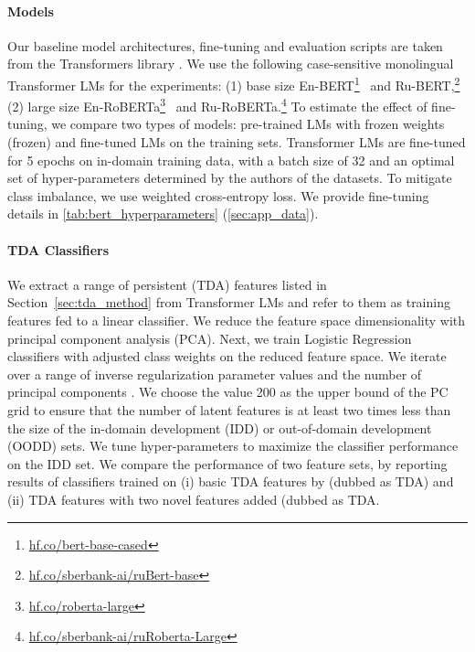 \documentclass[11pt]{article}
\begin{document}
\paragraph{Models}
Our baseline model architectures, fine-tuning and evaluation scripts are taken from the Transformers library \cite{wolf-etal-2020-transformers}. 
We use the following case-sensitive monolingual Transformer LMs for the experiments: 
(1) base size En-BERT\footnote{\href{https://huggingface.co/bert-base-cased}{hf.co/bert-base-cased}}~\cite{devlin-etal-2019-bert} and Ru-BERT,\footnote{\href{https://huggingface.co/sberbank-ai/ruBert-base}{hf.co/sberbank-ai/ruBert-base}} (2) large size En-RoBERTa\footnote{\href{https://huggingface.co/roberta-large}{hf.co/roberta-large}}~\cite{liu2019roberta} and Ru-RoBERTa.\footnote{\href{https://huggingface.co/sberbank-ai/ruRoberta-large}{hf.co/sberbank-ai/ruRoberta-Large}}
To estimate the effect of fine-tuning, we compare two types of models: pre-trained LMs with frozen weights (frozen) and fine-tuned LMs on the training sets.
Transformer LMs are fine-tuned for 5 epochs on in-domain training data, with a batch size of 32 and an optimal set of hyper-parameters determined by the authors of the datasets.
To mitigate class imbalance, we use weighted cross-entropy loss.
We provide fine-tuning details in \autoref{tab:bert_hyperparameters} (\autoref{sec:app_data}). 
\paragraph{TDA Classifiers}
We extract a range of persistent (TDA) features listed in Section~\ref{sec:tda_method} from Transformer LMs and refer to them as training features fed to a linear classifier.  
We reduce the feature space dimensionality with principal component analysis (PCA).
Next, we train Logistic Regression classifiers with adjusted class weights on the reduced feature space.
We iterate over a range of inverse regularization parameter values  and the number of principal components . 
We choose the value 200 as the upper bound of the PC grid to ensure that the number of latent features is at least two times less than the size of the  in-domain development (IDD) or out-of-domain development (OODD) sets. 
We tune hyper-parameters to maximize the classifier performance on the IDD set.
We compare the performance of two feature sets, by reporting results of classifiers trained on (i) basic TDA features by \citealp{kushnareva-etal-2021-artificial} (dubbed as TDA) and  (ii) TDA features with two novel features added (dubbed as TDA. 
\end{document}

